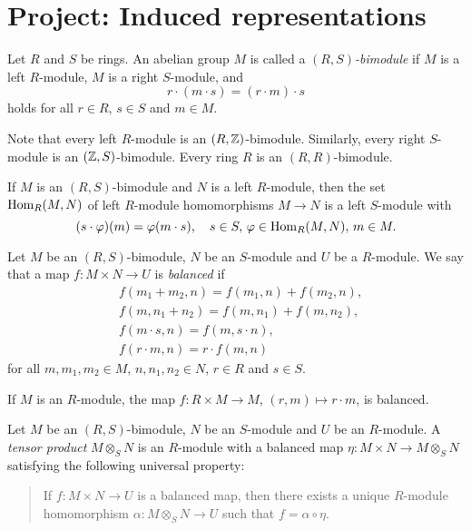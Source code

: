 \section{Project: Induced representations}



\begin{definition}
    Let $R$ and $S$ be rings. An abelian group $M$ is called 
    a \emph{$(R,S)$-bimodule} if $M$ is a left $R$-module, 
    $M$ is a right $S$-module, and 
    \[
    r\cdot (m\cdot s)=(r\cdot m)\cdot s
    \]
    holds for all $r\in R$, $s\in S$ and $m\in M$. 
\end{definition}

Note that every left $R$-module is an $(R,\mathbb{Z})$-bimodule. Similarly, every right $S$-module is an $(\mathbb{Z},S)$-bimodule. Every 
ring $R$ is an $(R,R)$-bimodule. 

\begin{example}
If $M$ is an $(R,S)$-bimodule and $N$ is a left 
$R$-module, then the set 
$\operatorname{Hom}_R(M,N)$ of left $R$-module homomorphisms $M\to N$ is a left 
$S$-module with 
\[
(s\cdot \varphi)(m)=\varphi(m\cdot s),\quad s\in S,\,\varphi\in\operatorname{Hom}_R(M,N),\,m\in M.
\]
\end{example}

Let $M$ be an $(R,S)$-bimodule, $N$ be an $S$-module and $U$ be a $R$-module. We say that a map  
$f\colon M\times N\to U$ 
is \emph{balanced} if 
\begin{align*}
    &f(m_1+m_2,n)=f(m_1,n)+f(m_2,n),\\
    &f(m,n_1+n_2)=f(m,n_1)+f(m,n_2),\\
    &f(m\cdot s,n)=f(m,s\cdot n),\\
    &f(r\cdot m,n)=r\cdot f(m,n)
\end{align*}
for all $m,m_1,m_2\in M$, $n,n_1,n_2\in N$, $r\in R$ and $s\in S$. 

\begin{example}
If $M$ is an $R$-module, the map $f\colon R\times M\to M$, $(r,m)\mapsto r\cdot m$, is balanced.  
\end{example}

Let $M$ be an $(R,S)$-bimodule, $N$ be an $S$-module and $U$ be an $R$-module. 
A \emph{tensor product} $M\otimes_S N$ is an $R$-module with a balanced map
$\eta\colon M\times N\to M\otimes_S N$ satisfying the following universal property:
\begin{quote}
If $f\colon M\times N\to U$ is a balanced map, then 
there exists a unique $R$-module homomorphism $\alpha\colon M\otimes_S N\to U$ such that $f=\alpha\circ\eta$. 
\end{quote}

